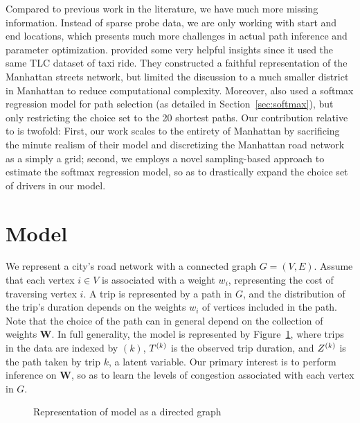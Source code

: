 \documentclass{article}
\begin{document}
Compared to previous work in the literature, we have much more missing information. Instead of sparse probe data, we are only working with start and end locations, which presents much more challenges in actual path inference and parameter optimization. \citet*{zhan2013urban} provided some very helpful insights since it used the same TLC dataset of taxi ride. They constructed a faithful representation of the Manhattan streets network, but limited the discussion to a much smaller district in Manhattan to reduce computational complexity. Moreover, \citet*{zhan2013urban} also used a softmax regression model for path selection (as detailed in Section~\ref{sec:softmax}), but only restricting the choice set to the 20 shortest paths. Our contribution relative to \citet*{zhan2013urban} is twofold: First, our work scales to the entirety of Manhattan by sacrificing the minute realism of their model and discretizing the Manhattan road network as a simply a grid; second, we employs a novel sampling-based approach to estimate the softmax regression model, so as to drastically expand the choice set of drivers in our model.

\section{Model}

We represent a city's road network with a connected graph $G = (V,E)$. Assume that each vertex $i \in V$ is associated with a weight $w_i$, representing the cost of traversing vertex $i$. A trip is represented by a path in $G$, and the distribution of the trip's duration depends on the weights $w_i$ of vertices included in the path. Note that the choice of the path can in general depend on the collection of weights $\bm W$. In full generality, the model is represented by Figure~\ref{fig:dgm}, where trips in the data are indexed by $(k)$, $T^{(k)}$ is the observed trip duration, and $Z^{(k)}$ is the path taken by trip $k$, a latent variable. Our primary interest is to perform inference on $\bm W$, so as to learn the levels of congestion associated with each vertex in $G$. 

\begin{figure}[h]
  \centering
  \caption{Representation of model as a directed graph}
  \label{fig:dgm}
  \vspace{1em}
\end{figure}
\end{document}
